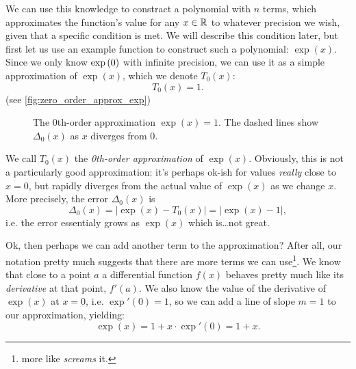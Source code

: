 We can use this knowledge to constract a polynomial with $n$ terms, which approximates the function's value for any $x\in\mathbb{R}^{}$ to whatever precision we wish, given that a specific condition is met. We will describe this condition later, but first let us use an example function to construct such a polynomial: $\exp(x)$. Since we only know $\exp\left(0\right)$ with infinite precision, we can use it as a simple approximation of $\exp(x)$, which we denote $T_{0}(x)$:
\begin{equation}
  T_{0}(x) = 1.
  \label{eq:zero_order_approx_exp}
\end{equation}
(see \autoref{fig:zero_order_approx_exp})

\begin{figure}
  \centering
  \caption{The 0th-order approximation $\exp(x)=1$. The dashed lines show $\Delta_{0}(x)$ as $x$ diverges from $0$.}
  \label{fig:zero_order_approx_exp}
\end{figure}

We call $T_{0}(x)$ the \emph{0th-order approximation} of $\exp(x)$. Obviously, this is not a particularly good approximation: it's perhaps ok-ish for values \textit{really} close to $x=0$, but rapidly diverges from the actual value of $\exp(x)$ as we change $x$. More precisely, the error $\Delta_{0}(x)$ is
\begin{equation}
  \Delta_{0}(x) = \lvert \exp(x) - T_{0}(x) \rvert = \lvert \exp(x)-1 \rvert,
  \label{eq:exp_err_0}
\end{equation}
i.e. the error essentialy grows as $\exp(x)$ which is\dots not great.

Ok, then perhaps we can add another term to the approximation? After all, our notation pretty much suggests that there are more terms we can use\footnote{more like \textit{screams} it.}. We know that close to a point $a$ a differential function $f(x)$ behaves pretty much like its \textit{derivative} at that point, $f'(a)$. We also know the value of the derivative of $\exp(x)$ at $x=0$, i.e. $\exp'(0)=1$, so we can add a line of slope $m=1$ to our approximation, yielding:
\begin{equation}
  \exp(x) = 1 + x\cdot\exp'\left(0\right) = 1+x.
  \label{eq:first_order_approx_exp}
\end{equation}

